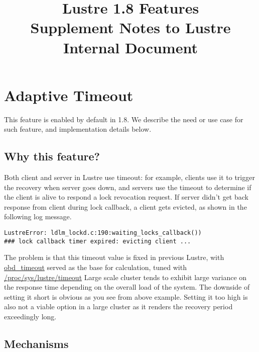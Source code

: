 \documentclass{article}
\title{Lustre 1.8 Features \\Supplement Notes to Lustre Internal Document}
\author{}
\begin{document}
\maketitle


\section{Adaptive Timeout}

This feature is enabled by default in 1.8. We describe the need or use case for
such feature, and implementation details below.

\subsection{Why this feature?}

Both client and server in Lustre use timeout: for example, clients use it to
trigger the recovery when server goes down, and servers use the timeout to
determine if the client is alive to respond a lock revocation request.
If server didn't get back response from client during lock callback, a client
gets evicted, as shown in the following log message.
 
\begin{Verbatim}
LustreError: ldlm_lockd.c:190:waiting_locks_callback()) 
### lock callback timer expired: evicting client ...
\end{Verbatim}

The problem is that this timeout value is fixed in previous Lustre, with
\url{obd_timeout} served as the base for calculation, tuned with
\url{/proc/sys/lustre/timeout} Large scale cluster tends to exhibit large
variance on the response time depending on the overall load of the system. The
downside of setting it short is obvious as you see from above example. Setting
it too high is also not a viable option in a large cluster as it renders the
recovery period exceedingly long.


\subsection{Mechanisms}
\end{document}

